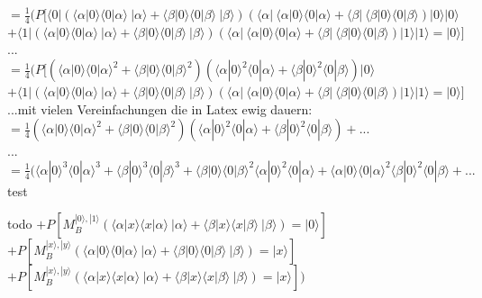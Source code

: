 \documentclass[a4paper]{scrartcl}
\begin{document}
\begin{enumerate}[a)]
$=\frac{1}{4} (P[ \langle 0|(\langle \alpha|0\rangle \langle 0|\alpha\rangle~|\alpha\rangle + \langle \beta|0\rangle \langle 0|\beta\rangle~|\beta\rangle) (\langle \alpha|~\langle \alpha|0\rangle \langle 0|\alpha\rangle + \langle \beta|~\langle \beta|0\rangle \langle 0|\beta\rangle)|0\rangle |0\rangle$\\
$+ \langle 1|(\langle \alpha|0\rangle \langle 0|\alpha\rangle~|\alpha\rangle + \langle \beta|0\rangle \langle 0|\beta\rangle~|\beta\rangle) (\langle \alpha|~\langle \alpha|0\rangle \langle 0|\alpha\rangle + \langle \beta|~\langle \beta|0\rangle \langle 0|\beta\rangle)|1\rangle |1\rangle =|0\rangle]$\\

...\\
$=\frac{1}{4} (P[ (\langle \alpha|0\rangle \langle 0|\alpha\rangle^2 + \langle \beta|0\rangle \langle 0|\beta\rangle^2) (\langle \alpha|0\rangle^2 \langle 0|\alpha\rangle + \langle \beta|0\rangle^2 \langle 0|\beta\rangle) |0\rangle$\\
$+ \langle 1|(\langle \alpha|0\rangle \langle 0|\alpha\rangle~|\alpha\rangle + \langle \beta|0\rangle \langle 0|\beta\rangle~|\beta\rangle) (\langle \alpha|~\langle \alpha|0\rangle \langle 0|\alpha\rangle + \langle \beta|~\langle \beta|0\rangle \langle 0|\beta\rangle)|1\rangle |1\rangle =|0\rangle]$\\

...mit vielen Vereinfachungen die in Latex ewig dauern:\\
$=\frac{1}{4} (\langle \alpha|0\rangle \langle 0|\alpha\rangle^2 + \langle \beta|0\rangle \langle 0|\beta\rangle^2) (\langle \alpha|0\rangle^2 \langle 0|\alpha\rangle + \langle \beta|0\rangle^2 \langle 0|\beta\rangle) +...$\\

...\\
$=\frac{1}{4} (\langle \alpha|0\rangle^3 \langle 0|\alpha\rangle^3 + \langle \beta|0\rangle^3 \langle 0|\beta\rangle^3 + \langle \beta|0\rangle \langle 0|\beta\rangle^2 \langle \alpha|0\rangle^2 \langle 0|\alpha\rangle + \langle \alpha|0\rangle \langle 0|\alpha\rangle^2 \langle \beta|0\rangle^2 \langle 0|\beta\rangle+...$\\

test


todo
$+ P[M_B^{|0\rangle,|1\rangle}(\langle \alpha|x\rangle \langle x|\alpha\rangle~|\alpha\rangle + \langle \beta|x\rangle \langle x|\beta\rangle~|\beta\rangle)=|0\rangle]$\\
$+ P[M_B^{|x\rangle,|y\rangle}(\langle \alpha|0\rangle \langle 0|\alpha\rangle~|\alpha\rangle + \langle \beta|0\rangle \langle 0|\beta\rangle~|\beta\rangle)=|x\rangle]$\\
$+ P[M_B^{|x\rangle,|y\rangle}(\langle \alpha|x\rangle \langle x|\alpha\rangle~|\alpha\rangle + \langle \beta|x\rangle \langle x|\beta\rangle~|\beta\rangle)=|x\rangle])$\\





\end{enumerate}
\end{document}
